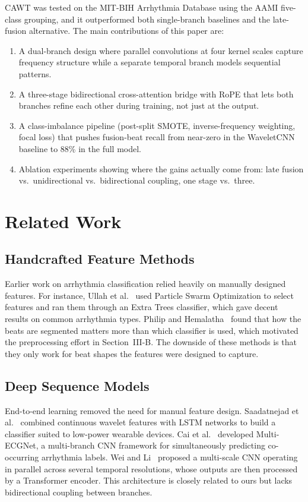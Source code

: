 \documentclass[conference]{IEEEtran}
\begin{document}
CAWT was tested on the MIT-BIH Arrhythmia Database using the AAMI five-class grouping, and it outperformed both single-branch baselines and the late-fusion alternative. The main contributions of this paper are:
 
\begin{enumerate}
    \item A dual-branch design where parallel convolutions at four kernel scales capture frequency structure while a separate temporal branch models sequential patterns.
    \item A three-stage bidirectional cross-attention bridge with RoPE that lets both branches refine each other during training, not just at the output.
    \item A class-imbalance pipeline (post-split SMOTE, inverse-frequency weighting, focal loss) that pushes fusion-beat recall from near-zero in the WaveletCNN baseline to 88\% in the full model.
    \item Ablation experiments showing where the gains actually come from: late fusion vs.\ unidirectional vs.\ bidirectional coupling, one stage vs.\ three.
\end{enumerate}
 
\section{Related Work}
 
\subsection{Handcrafted Feature Methods}
Earlier work on arrhythmia classification relied heavily on manually designed features. For instance, Ullah et al.~\cite{ullah2024} used Particle Swarm Optimization to select features and ran them through an Extra Trees classifier, which gave decent results on common arrhythmia types. Philip and Hemalatha~\cite{philip2023} found that how the beats are segmented matters more than which classifier is used, which motivated the preprocessing effort in Section~III-B. The downside of these methods is that they only work for beat shapes the features were designed to capture.
 
\subsection{Deep Sequence Models}
End-to-end learning removed the need for manual feature design. Saadatnejad et al.~\cite{saadatnejad2020} combined continuous wavelet features with LSTM networks to build a classifier suited to low-power wearable devices. Cai et al.~\cite{cai2020} developed Multi-ECGNet, a multi-branch CNN framework for simultaneously predicting co-occurring arrhythmia labels. Wei and Li~\cite{wei2025} proposed a multi-scale CNN operating in parallel across several temporal resolutions, whose outputs are then processed by a Transformer encoder. This architecture is closely related to ours but lacks bidirectional coupling between branches.
 
\end{document}
